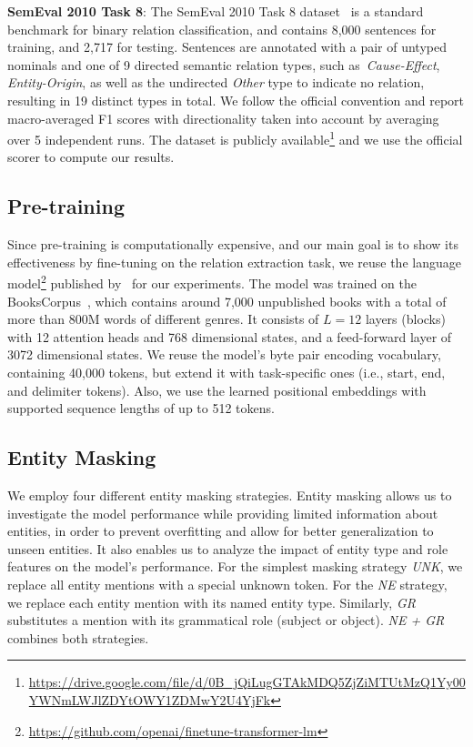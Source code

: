 \documentclass[akbc,twoside,11pt]{article}
\begin{document}
\noindent \textbf{SemEval 2010 Task 8}: The SemEval 2010 Task 8 dataset~\cite{hendrickx_semeval2010t8_2010} is a standard benchmark for binary relation classification, and contains 8,000 sentences for training, and 2,717 for testing. Sentences are annotated with a pair of untyped nominals and one of 9 directed semantic relation types, such as\ \emph{Cause-Effect}, \emph{Entity-Origin}, as well as the undirected \emph{Other} type to indicate no relation, resulting in 19 distinct types in total.  We follow the official convention and report macro-averaged F1 scores with directionality taken into account by averaging over 5 independent runs. The dataset is publicly available\footnote{\scriptsize\url{https://drive.google.com/file/d/0B_jQiLugGTAkMDQ5ZjZiMTUtMzQ1Yy00YWNmLWJlZDYtOWY1ZDMwY2U4YjFk}} and we use the official scorer to compute our results.

\subsection{Pre-training}
\label{subsec:exp_pretraining}
Since pre-training is computationally expensive, and our main goal is to show its effectiveness by fine-tuning on the relation extraction task, we reuse the language model\footnote{\url{https://github.com/openai/finetune-transformer-lm}} published by~\citet{radford_improvinglu_2018} for our experiments. The model was trained on the BooksCorpus~\cite{zhu_aligningba_2015}, which contains around 7,000 unpublished books with a total of more than 800M words of different genres. It consists of $L=12$ layers (blocks) with 12 attention heads and 768 dimensional states, and a feed-forward layer of 3072 dimensional states. We reuse the model's byte pair encoding vocabulary, containing 40,000 tokens, but extend it with task-specific ones (i.e., start, end, and delimiter tokens). Also, we use the learned positional embeddings with supported sequence lengths of up to 512 tokens.

\subsection{Entity Masking}
\label{subsec:exp_masking}
We employ four different entity masking strategies. Entity masking allows us to investigate the model performance while providing limited information about entities, in order to prevent overfitting and allow for better generalization to unseen entities. It also enables us to analyze the impact of entity type and role features on the model's performance. For the simplest masking strategy \textit{UNK}, we replace all entity mentions with a special unknown token. For the \textit{NE} strategy, we replace each entity mention with its named entity type. Similarly, \textit{GR} substitutes a mention with its grammatical role (subject or object). \textit{NE + GR} combines both strategies.
\end{document}

